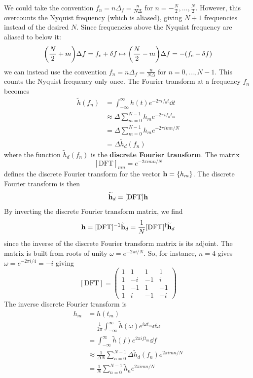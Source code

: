 \documentclass[a4paper]{article}
\begin{document}
We could take the convention \( f_n = n \Delta_f = \frac{n}{N\Delta} \) for \( n = -\frac{N}{2}, \dots, \frac{N}{2} \).
However, this overcounts the Nyquist frequency (which is aliased), giving \( N + 1 \) frequencies instead of the desired \( N \).
Since frequencies above the Nyquist frequency are aliased to below it:
\[
	\qty(\frac{N}{2} + m) \Delta f = f_c + \delta f \mapsto \qty(\frac{N}{2} - m)\Delta f = -(f_c - \delta f)
\]
we can instead use the convention \( f_n = n \Delta_f = \frac{n}{N\Delta} \) for \( n = 0, \dots, N - 1 \).
This counts the Nyquist frequency only once.
The Fourier transform at a frequency \( f_n \) becomes
\begin{align*}
	\widetilde h(f_n) & = \int_{-\infty}^\infty h(t) e^{-2\pi if_n t} \dd{t}    \\
	                  & \approx \Delta \sum_{m=0}^{N-1} h_m e^{-2\pi i f_n t_m} \\
	                  & = \Delta \sum_{m=0}^{N-1} h_m e^{-2\pi i m n / N}       \\
	                  & = \Delta \widetilde h_d(f_n)
\end{align*}
where the function \( \widetilde h_d(f_n) \) is the \textbf{discrete Fourier transform}.
The matrix 
\[
	[\mathrm{DFT}]_{mn} = e^{-2\pi i m n / N}
\]
defines the discrete Fourier transform for the vector \( {\bf h} = \qty{h_m} \).
The discrete Fourier transform is then
\[
	\widetilde {{\bf h}}_d = [\mathrm{DFT}] {\bf h}
\]
By inverting the discrete Fourier transform matrix, we find
\[
	{\bf h} = [\mathrm{DFT}]^{-1} \widetilde {{\bf h}}_d = \frac{1}{N} [\mathrm{DFT}]^\dagger \widetilde {{\bf h}}_d
\]
since the inverse of the discrete Fourier transform matrix is its adjoint.
The matrix is built from roots of unity \( \omega = e^{-2\pi i/N} \).
So, for instance, \( n = 4 \) gives \( \omega = e^{-2\pi i/4} = -i \) giving
\[
	[\mathrm{DFT}] = \begin{pmatrix}
		1 & 1  & 1  & 1  \\
		1 & -i & -1 & i  \\
		1 & -1 & 1  & -1 \\
		1 & i  & -1 & -i
	\end{pmatrix}
\]
The inverse discrete Fourier transform is
\begin{align*}
	h_m & = h(t_m)                                                                                  \\
	    & = \frac{1}{2\pi} \int_{-\infty}^\infty \widetilde h(\omega) e^{i \omega t_m} \dd{\omega}  \\
	    & = \int_{-\infty}^\infty \widetilde h(f) e^{2\pi i f t_m} \dd{f}                           \\
	    & \approx \frac{1}{\Delta N} \sum_{n=0}^{N-1} \Delta \widetilde h_d(f_n) e^{2\pi i m n / N} \\
	    & = \frac{1}{N} \sum_{n=0}^{N-1} \widetilde h_n e^{2\pi i m n / N}
\end{align*}
\end{document}

